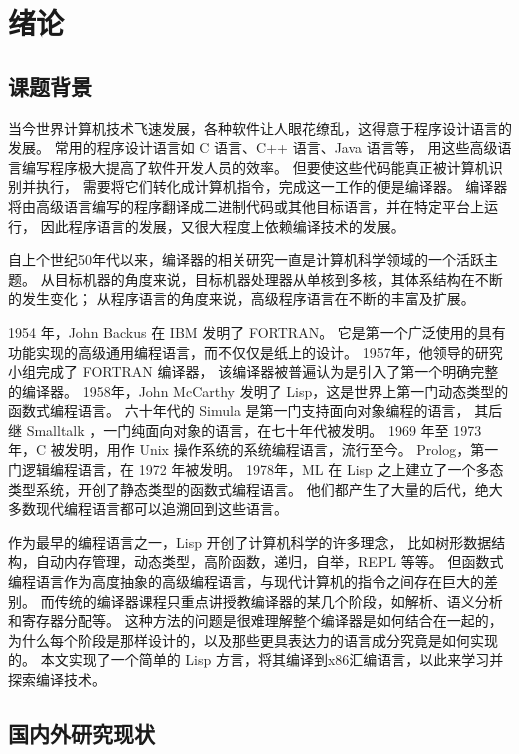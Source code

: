 
\chapter{绪论}

\section{课题背景}

当今世界计算机技术飞速发展，各种软件让人眼花缭乱，这得意于程序设计语言的发展。
常用的程序设计语言如 C 语言、C++ 语言、Java 语言等，
用这些高级语言编写程序极大提高了软件开发人员的效率。
但要使这些代码能真正被计算机识别并执行，
需要将它们转化成计算机指令，完成这一工作的便是编译器。
编译器将由高级语言编写的程序翻译成二进制代码或其他目标语言，并在特定平台上运行，
因此程序语言的发展，又很大程度上依赖编译技术的发展。

自上个世纪50年代以来，编译器的相关研究一直是计算机科学领域的一个活跃主题。
从目标机器的角度来说，目标机器处理器从单核到多核，其体系结构在不断的发生变化；
从程序语言的角度来说，高级程序语言在不断的丰富及扩展。

1954 年，John Backus 在 IBM 发明了 FORTRAN。
它是第一个广泛使用的具有功能实现的高级通用编程语言，而不仅仅是纸上的设计。
1957年，他领导的研究小组完成了 FORTRAN 编译器，
该编译器被普遍认为是引入了第一个明确完整的编译器。
1958年，John McCarthy 发明了 Lisp\cite{McCarthy_1960}，这是世界上第一门动态类型的函数式编程语言。
六十年代的 Simula 是第一门支持面向对象编程的语言，
其后继 Smalltalk ，一门纯面向对象的语言，在七十年代被发明。
1969 年至 1973 年，C 被发明，用作 Unix 操作系统的系统编程语言，流行至今。
Prolog，第一门逻辑编程语言，在 1972 年被发明。
1978年，ML 在 Lisp 之上建立了一个多态类型系统，开创了静态类型的函数式编程语言。
他们都产生了大量的后代，绝大多数现代编程语言都可以追溯回到这些语言。

作为最早的编程语言之一，Lisp 开创了计算机科学的许多理念，
比如树形数据结构，自动内存管理，动态类型，高阶函数，递归，自举，REPL 等等。
但函数式编程语言作为高度抽象的高级编程语言，与现代计算机的指令之间存在巨大的差别。
而传统的编译器课程只重点讲授教编译器的某几个阶段，如解析、语义分析和寄存器分配等。
这种方法的问题是很难理解整个编译器是如何结合在一起的，
为什么每个阶段是那样设计的，以及那些更具表达力的语言成分究竟是如何实现的。
本文实现了一个简单的 Lisp 方言，将其编译到x86汇编语言，以此来学习并探索编译技术。

\section{国内外研究现状}

